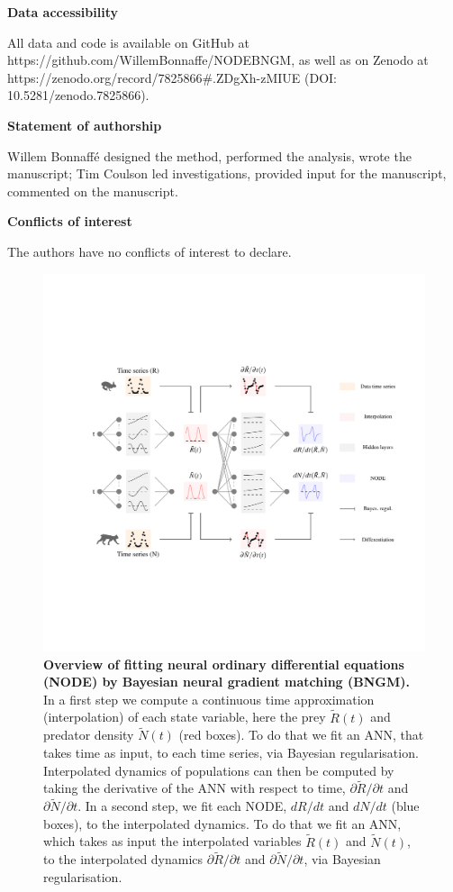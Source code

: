 \documentclass[11pt, oneside]{article}
\begin{document}
\textbf{Data accessibility}

All data and code is available on GitHub at https://github.com/WillemBonnaffe/NODEBNGM, as well as on Zenodo at https://zenodo.org/record/7825866\#.ZDgXh-zMIUE (DOI: 10.5281/zenodo.7825866).

\textbf{Statement of authorship}

Willem Bonnaff\'e designed the method, performed the analysis, wrote the manuscript; 
Tim Coulson led investigations, provided input for the manuscript, commented on the manuscript.

\textbf{Conflicts of interest}

The authors have no conflicts of interest to declare.

\printbibliography 

\newpage
{}

\newpage
\begin{figure}[H]
\includegraphics[width=\linewidth]{figure_1.png}
\caption{
    \textbf{Overview of fitting neural ordinary differential equations (NODE) by Bayesian neural gradient matching (BNGM).}
    In a first step we compute a continuous time approximation (interpolation) of each state variable, here the prey $\tilde{R}(t)$ and predator density $\tilde{N}(t)$ (red boxes).
    To do that we fit an ANN, that takes time as input, to each time series, via Bayesian regularisation.
    Interpolated dynamics of populations can then be computed by taking the derivative of the ANN with respect to time, $\partial\tilde{R}/\partial t$ and $\partial\tilde{N}/\partial t$.
    In a second step, we fit each NODE, $dR/dt$ and $dN/dt$ (blue boxes), to the interpolated dynamics.
    To do that we fit an ANN, which takes as input the interpolated variables $\tilde{R}(t)$ and $\tilde{N}(t)$, to the interpolated dynamics $\partial\tilde{R}/\partial t$ and $\partial\tilde{N}/\partial t$, via Bayesian regularisation.
}
\end{figure}
\newpage
\end{document}
